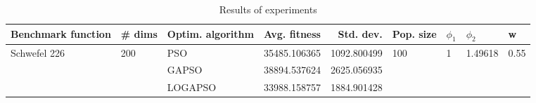 \begin{table}
\centering
\caption{Results of experiments}
\begin{tabular}{lllrrllll}
\toprule
           Benchmark function &              \# dims & Optim. algorithm &  Avg. fitness &   Std. dev. &            Pop. size &         $\phi_{1}$ &               $\phi_{2}$ &                     w \\
\midrule
\multirow{3}{*}{Schwefel 226} & \multirow{3}{*}{200} &              PSO &  35485.106365 & 1092.800499 & \multirow{3}{*}{100} & \multirow{3}{*}{1} & \multirow{3}{*}{1.49618} & \multirow{3}{*}{0.55} \\
                              &                      &            GAPSO &  38894.537624 & 2625.056935 &                      &                    &                          &                       \\
                              &                      &          LOGAPSO &  33988.158757 & 1884.901428 &                      &                    &                          &                       \\
\bottomrule
\end{tabular}
\end{table}
